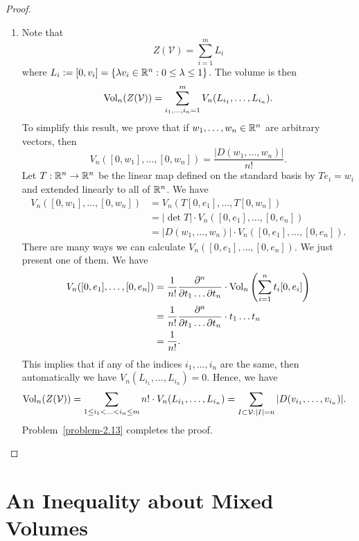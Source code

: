 \documentclass[12pt]{article}
\begin{document}
\begin{proof}
\begin{enumerate}[label = (\alph*)]
		\item Note that 
		\[
			Z(\mathcal{V}) = \sum_{i = 1}^m L_i
		\]
		where $L_i := [0, v_i] = \{\lambda v_i \in \mathbb{R}^n : 0 \leq \lambda \leq 1\}$. The volume is then 
		\[
			\operatorname{Vol}_n(Z(\mathcal{V})) = \sum_{i_1, \ldots, i_n = 1}^m V_n(L_{i_1}, \ldots, L_{i_n}).
		\]
		To simplify this result, we prove that if $w_1, \ldots, w_n \in \mathbb{R}^n$ are arbitrary vectors, then 
		\[
			V_n([0, w_1], \ldots, [0, w_n]) = \frac{|D (w_1, \ldots, w_n)|}{n!}.
		\]
		Let $T : \mathbb{R}^n \to \mathbb{R}^n$ be the linear map defined on the standard basis by $Te_i = w_i$ and extended linearly to all of $\mathbb{R}^n$. We have 
		\begin{align*}
			V_n([0, w_1], \ldots, [0, w_n]) & = V_n(T[0, e_1], \ldots, T[0, w_n]) \\
			& = |\det T| \cdot V_n([0, e_1], \ldots, [0, e_n]) \\
			& = |D(w_1, \ldots, w_n)| \cdot V_n([0, e_1], \ldots, [0, e_n]). 
		\end{align*}
		There are many ways we can calculate $V_n([0, e_1], \ldots, [0, e_n])$. We just present one of them. We have 
		\begin{align*}
			V_n([0, e_1], \ldots, [0, e_n]) & = \frac{1}{n!} \frac{\partial^n}{\partial t_1 \ldots \partial t_n} \cdot \operatorname{Vol}_n \left ( \sum_{i = 1}^n t_i [0, e_i] \right ) \\
			& =\frac{1}{n!} \frac{\partial^n}{\partial t_1 \ldots \partial t_n} \cdot t_1 \ldots t_n \\
			& = \frac{1}{n!}. 
		\end{align*}
		This implies that if any of the indices $i_1, \ldots, i_n$ are the same, then automatically we have $V_n(L_{i_1}, \ldots, L_{i_n}) = 0$. Hence, we have 
		\begin{align*}
			\operatorname{Vol}_n(Z(\mathcal{V})) & = \sum_{1 \leq i_1 < \ldots < i_n \leq m} n! \cdot V_n(L_{i_1}, \ldots, L_{i_n}) = \sum_{I \subset \mathcal{V} : |I| = n} |D(v_{i_1}, \ldots, v_{i_n})|.
		\end{align*}
		Problem~\ref{problem-2.13} completes the proof. 
	\end{enumerate}
\end{proof}

\newpage 

\section{An Inequality about Mixed Volumes}
\end{document}
